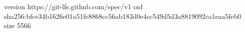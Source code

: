 version https://git-lfs.github.com/spec/v1
oid sha256:bfce34b1626e01a51fe8868cc56ab183d0e4cc549d5d3a8819092ca1eaa5feb0
size 5566
